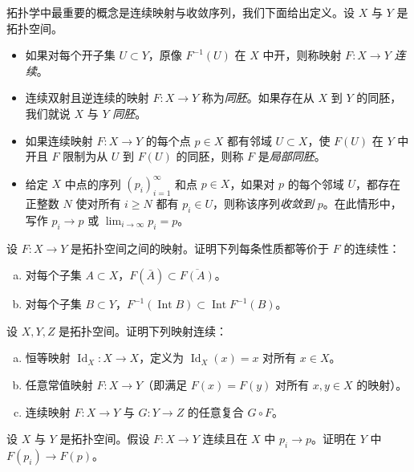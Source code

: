 \documentclass[../../main.tex]{subfiles}
\begin{document}
拓扑学中最重要的概念是连续映射与收敛序列，我们下面给出定义。设 $X$ 与 $Y$ 是拓扑空间。
\begin{itemize}
\item 如果对每个开子集 $U\subset Y$，原像 $F^{-1}(U)$ 在 $X$ 中开，则称映射 $F:X\to Y$ \emph{连续}。
\item 连续双射且逆连续的映射 $F:X\to Y$ 称为\emph{同胚}。如果存在从 $X$ 到 $Y$ 的同胚，我们就说 $X$ 与 $Y$ \emph{同胚}。
\item 如果连续映射 $F:X\to Y$ 的每个点 $p\in X$ 都有邻域 $U\subset X$，使 $F(U)$ 在 $Y$ 中开且 $F$ 限制为从 $U$ 到 $F(U)$ 的同胚，则称 $F$ 是\emph{局部同胚}。
\item 给定 $X$ 中点的序列 $(p_i)_{i=1}^\infty$ 和点 $p\in X$，如果对 $p$ 的每个邻域 $U$，都存在正整数 $N$ 使对所有 $i\geqslant N$ 都有 $p_i\in U$，则称该序列\emph{收敛到} $p$。在此情形中，写作 $p_i\to p$ 或 $\lim_{i\to\infty}p_i=p$。
\end{itemize}

\begin{exercise}\label{exercise:appA-A-1}
设 $F:X\to Y$ 是拓扑空间之间的映射。证明下列每条性质都等价于 $F$ 的连续性：
\begin{enumerate}[(a)]
\item 对每个子集 $A\subset X$，$F(\bar A)\subset\overline{F(A)}$。
\item 对每个子集 $B\subset Y$，$F^{-1}(\operatorname{Int}B)\subset\operatorname{Int}F^{-1}(B)$。
\end{enumerate}
\end{exercise}

\begin{exercise}\label{exercise:appA-A-2}
设 $X,Y,Z$ 是拓扑空间。证明下列映射连续：
\begin{enumerate}[(a)]
\item 恒等映射 $\operatorname{Id}_X:X\to X$，定义为 $\operatorname{Id}_X(x)=x$ 对所有 $x\in X$。
\item 任意常值映射 $F:X\to Y$（即满足 $F(x)=F(y)$ 对所有 $x,y\in X$ 的映射）。
\item 连续映射 $F:X\to Y$ 与 $G:Y\to Z$ 的任意复合 $G\circ F$。
\end{enumerate}
\end{exercise}

\begin{exercise}\label{exercise:appA-A-3}
设 $X$ 与 $Y$ 是拓扑空间。假设 $F:X\to Y$ 连续且在 $X$ 中 $p_i\to p$。证明在 $Y$ 中 $F(p_i)\to F(p)$。
\end{exercise}
\end{document}
